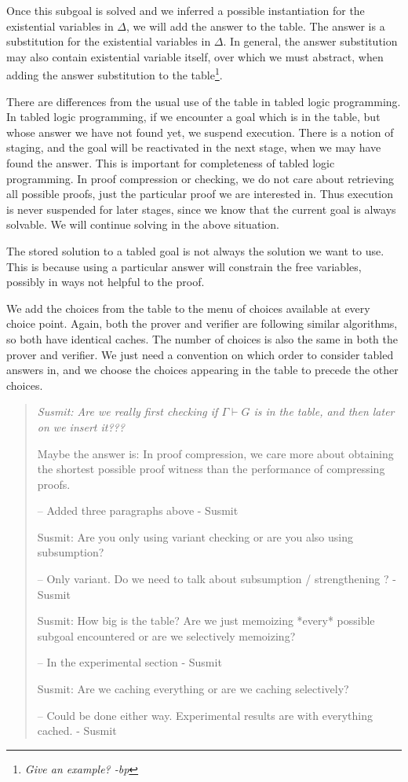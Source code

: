 \documentclass{acmconf}
\newcommand{\vd}{\vdash}
\newcommand{\ednote}[1]{\footnote{\it #1}}
\newenvironment{note}{\begin{quote}\message{note!}\it}{\end{quote}}
\begin{document}
Once this subgoal is solved and we inferred a possible instantiation
for the existential variables in $\Delta$, we will add the answer to
the table. The answer is a substitution for the existential variables
in $\Delta$. In general, the answer substitution may also contain
existential variable itself, over which we must abstract, when adding
the answer substitution to the table\ednote{Give an example? -bp}.

There are differences from the usual use of the table in tabled logic
programming. In tabled logic programming, if we encounter a goal which
is in the table, but whose answer we have not found yet, we suspend
execution. There is a notion of staging, and the goal will be
reactivated in the next stage, when we may have found the answer. This
is important for completeness of tabled logic programming. In proof
compression or checking, we do not care about retrieving all possible
proofs, just the particular proof we are interested in. Thus execution
is never suspended for later stages, since we know that the current
goal is always solvable. We will continue solving in the above situation.

The stored solution to a tabled goal is not always the solution we
want to use.  This is because using a particular answer will constrain
the free variables, possibly in ways not helpful to the proof. 

We add the choices from the table to the menu of choices available at
every choice point. Again, both the prover and verifier are following
similar algorithms, so both have identical caches. The number of
choices is also the same in both the prover and verifier. We just need
a convention on which order to consider tabled answers in, and we
choose the choices appearing in the table to precede the other
choices.

\begin{note}
  Susmit: Are we really first checking if $\Gamma \vd G$ is in the
  table, and then later on we insert it???
  
   Maybe the answer is: In proof compression, we care more about
   obtaining the shortest possible proof witness than the performance
   of compressing proofs. 

-- Added three paragraphs above - Susmit

  Susmit: Are you only using variant checking or are you also using
  subsumption?

-- Only variant. Do we need to talk about subsumption / strengthening ? - Susmit

  Susmit: How big is the table? Are we just memoizing *every* possible
  subgoal encountered or are we selectively memoizing?

-- In the experimental section - Susmit

  Susmit: Are we caching everything or are we caching selectively?

-- Could be done either way. Experimental results are with everything cached. - Susmit
\end{note}
\end{document}
